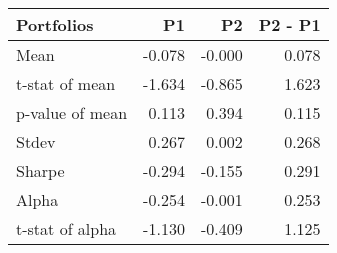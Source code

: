 \begin{tabular}{lrrr}
\toprule
Portfolios & P1 & P2 & P2 - P1 \\
\midrule
Mean & -0.078 & -0.000 & 0.078 \\
t-stat of mean & -1.634 & -0.865 & 1.623 \\
p-value of mean & 0.113 & 0.394 & 0.115 \\
Stdev & 0.267 & 0.002 & 0.268 \\
Sharpe & -0.294 & -0.155 & 0.291 \\
Alpha & -0.254 & -0.001 & 0.253 \\
t-stat of alpha & -1.130 & -0.409 & 1.125 \\
\bottomrule
\end{tabular}
